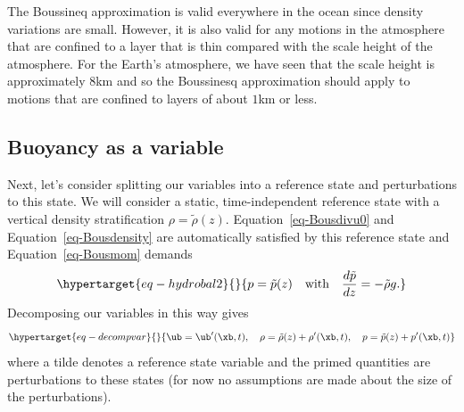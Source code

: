 \documentclass[
  letterpaper,
  twocolumn,
  landscape]{report}
\begin{document}
\begin{tcolorbox}[enhanced jigsaw, toprule=.15mm, left=2mm, opacityback=0, breakable, arc=.35mm, colback=white, rightrule=.15mm, bottomrule=.15mm, colframe=quarto-callout-note-color-frame, leftrule=.75mm]
\begin{minipage}[t]{5.5mm}
\textcolor{quarto-callout-note-color}{\faInfo}
\end{minipage}%
\begin{minipage}[t]{\textwidth - 5.5mm}

The Boussineq approximation is valid everywhere in the ocean since
density variations are small. However, it is also valid for any motions
in the atmosphere that are confined to a layer that is thin compared
with the scale height of the atmosphere. For the Earth's atmosphere, we
have seen that the scale height is approximately \(8\)km and so the
Boussinesq approximation should apply to motions that are confined to
layers of about \(1\)km or less.

\end{minipage}%
\end{tcolorbox}

\hypertarget{buoyancy-as-a-variable}{%
\subsection{Buoyancy as a variable}\label{buoyancy-as-a-variable}}

Next, let's consider splitting our variables into a reference state and
perturbations to this state. We will consider a static, time-independent
reference state with a vertical density stratification
\(\rho=\tilde\rho(z)\). Equation~\ref{eq-Bousdivu0} and
Equation~\ref{eq-Bousdensity} are automatically satisfied by this
reference state and Equation~\ref{eq-Bousmom} demands
\begin{equation}\protect\hypertarget{eq-hydrobal2}{}{
p=\tilde p(z) \quad \text{with} \quad \frac{d\tilde p}{dz} = -\tilde\rho g. 
}\label{eq-hydrobal2}\end{equation} Decomposing our variables in this
way gives \begin{equation}\protect\hypertarget{eq-decompvar}{}{
\ub = \ub'(\xb,t), \quad \rho = \tilde\rho(z) + \rho'(\xb,t), \quad p = \tilde p(z) + p'(\xb,t) 
}\label{eq-decompvar}\end{equation} where a tilde denotes a reference
state variable and the primed quantities are perturbations to these
states (for now no assumptions are made about the size of the
perturbations).
\end{document}

